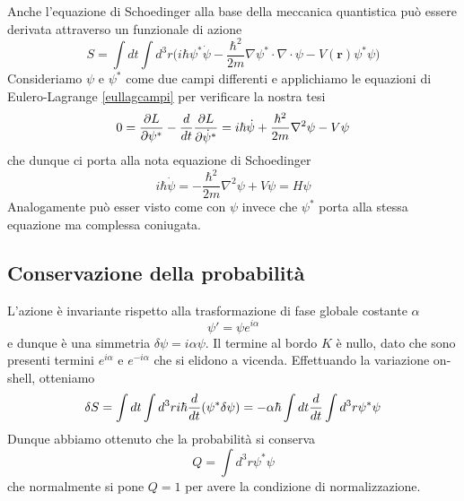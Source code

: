     Anche l'equazione di Schoedinger alla base della meccanica quantistica può essere derivata attraverso un funzionale di azione 
\begin{equation*}
    S = \int dt \int d^3 r \Big( i \hbar \psi^* \dot \psi - \frac{\hbar^2}{2m} \nabla \psi^* \cdot \nabla \cdot \psi - V(\mathbf r) \psi^* \psi \Big)
\end{equation*}
    Consideriamo $\psi$ e $\psi^*$ come due campi differenti e applichiamo le equazioni di Eulero-Lagrange \eqref{eullagcampi} per verificare la nostra tesi 
\begin{equation*}
    0 = \frac{\partial L}{\partial\psi^*} - \frac{d}{dt} \frac{\partial L}{\partial\dot \psi^*} = i \hbar \dot \psi + \frac{\hbar^2}{2m} \nabla^2 \psi - V \psi 
\end{equation*}
    che dunque ci porta alla nota equazione di Schoedinger
\begin{equation*}
    i \hbar \dot \psi = - \frac{\hbar^2}{2m} \nabla^2 \psi + V \psi = H \psi
\end{equation*}
    Analogamente può esser visto come con $\psi$ invece che $\psi^*$ porta alla stessa equazione ma complessa coniugata. 

\subsection{Conservazione della probabilità}

    L'azione è invariante rispetto alla trasformazione di fase globale costante $\alpha$
\begin{equation*}
    \psi' = \psi e^{i\alpha}
\end{equation*}
    e dunque è una simmetria $\delta \psi = i \alpha \psi$. Il termine al bordo $K$ è nullo, dato che sono presenti termini $e^{i\alpha}$ e $e^{-i\alpha}$ che si elidono a vicenda. Effettuando la variazione on-shell, otteniamo 
\begin{equation*}
    \delta S = \int dt \int d^3 r i \hbar \frac{d}{dt} (\psi^* \delta \psi) = - \alpha \hbar \int dt \frac{d}{dt} \int d^3 r \psi^* \psi
\end{equation*}
    Dunque abbiamo ottenuto che la probabilità si conserva 
\begin{equation*}
    Q = \int d^3 r \psi^* \psi
\end{equation*}
    che normalmente si pone $Q = 1$ per avere la condizione di normalizzazione. 
